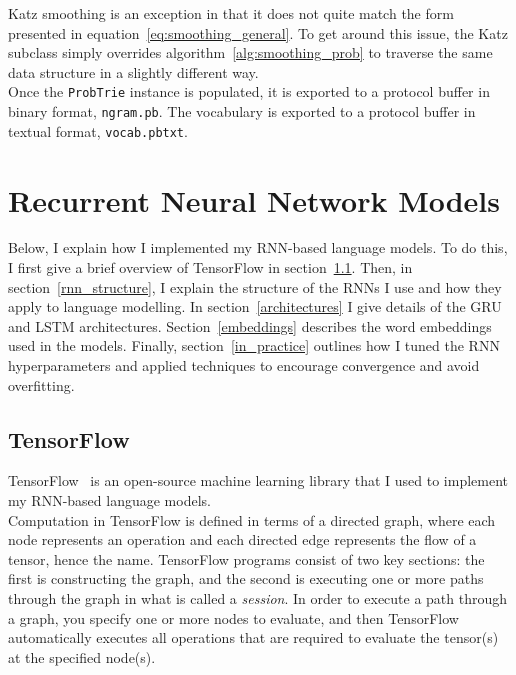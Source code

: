 \documentclass[a4paper, 12pt]{report}
\newcommand{\ttt}[1]{\texttt{#1}}
\newcommand{\tit}[1]{\textit{#1}}
\begin{document}
Katz smoothing is an exception in that it does not quite match the form presented in equation~\ref{eq:smoothing_general}. To get around this issue, the Katz subclass simply overrides algorithm~\ref{alg:smoothing_prob} to traverse the same data structure in a slightly different way. \\

Once the \ttt{ProbTrie} instance is populated, it is exported to a protocol buffer in binary format, \ttt{ngram.pb}. The vocabulary is exported to a protocol buffer in textual format, \ttt{vocab.pbtxt}.

\section{Recurrent Neural Network Models} \label{rnn_lm}

Below, I explain how I implemented my RNN-based language models. To do this, I first give a brief overview of TensorFlow in section~\ref{tensorflow}. Then, in section~\ref{rnn_structure}, I explain the structure of the RNNs I use and how they apply to language modelling. In section~\ref{architectures} I give details of the GRU and LSTM architectures. Section~\ref{embeddings} describes the word embeddings used in the models. Finally, section~\ref{in_practice} outlines how I tuned the RNN hyperparameters and applied techniques to encourage convergence and avoid overfitting.

\subsection{TensorFlow} \label{tensorflow}

TensorFlow~\cite{tensorflow:abadi2016} is an open-source machine learning library that I used to implement my RNN-based language models. \\

Computation in TensorFlow is defined in terms of a directed graph, where each node represents an operation and each directed edge represents the flow of a tensor, hence the name. TensorFlow programs consist of two key sections: the first is constructing the graph, and the second is executing one or more paths through the graph in what is called a \tit{session}. In order to execute a path through a graph, you specify one or more nodes to evaluate, and then TensorFlow automatically executes all operations that are required to evaluate the tensor(s) at the specified node(s). \\
\end{document}
